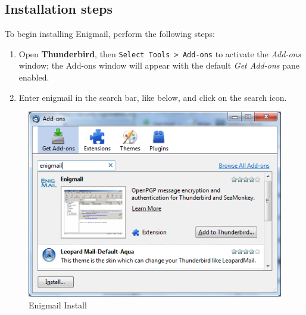 \subsection{Installation steps}

To begin installing Enigmail, perform the following steps:

\begin{enumerate}[1.]
\item
  Open \textbf{Thunderbird}, then \verb!Select Tools > Add-ons! to
  activate the \emph{Add-ons} window; the Add-ons window will appear
  with the default \emph{Get Add-ons} pane enabled.
\item
  Enter enigmail in the search bar, like below, and click on the search
  icon.
\end{enumerate}
\begin{figure}[htbp]
\centering
\includegraphics{enigmail_inst_1.png}
\caption{Enigmail Install}
\end{figure}

